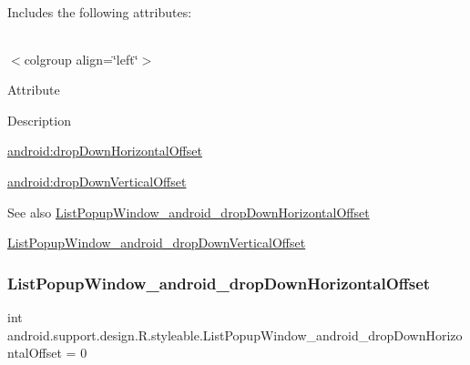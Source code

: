 Includes the following attributes\+:

\tabulinesep=1mm
\begin{longtabu} spread 0pt [c]{*{0}{|X[-1]}|}
\hline
\end{longtabu}
$<$colgroup align=\char`\"{}left\char`\"{}$>$ 

Attribute

Description 

{\ttfamily \hyperlink{classandroid_1_1support_1_1design_1_1R_1_1styleable_a142528111f7468c14655fbf25419c0f6}{android\+:drop\+Down\+Horizontal\+Offset}}

{\ttfamily \hyperlink{classandroid_1_1support_1_1design_1_1R_1_1styleable_a22740fd93f1b8f84c40c5169d6884ff7}{android\+:drop\+Down\+Vertical\+Offset}}

\begin{DoxySeeAlso}{See also}
\hyperlink{classandroid_1_1support_1_1design_1_1R_1_1styleable_a142528111f7468c14655fbf25419c0f6}{List\+Popup\+Window\+\_\+android\+\_\+drop\+Down\+Horizontal\+Offset} 

\hyperlink{classandroid_1_1support_1_1design_1_1R_1_1styleable_a22740fd93f1b8f84c40c5169d6884ff7}{List\+Popup\+Window\+\_\+android\+\_\+drop\+Down\+Vertical\+Offset} 
\end{DoxySeeAlso}
\mbox{\label{classandroid_1_1support_1_1design_1_1R_1_1styleable_a142528111f7468c14655fbf25419c0f6}} 
\subsubsection{\texorpdfstring{List\+Popup\+Window\+\_\+android\+\_\+drop\+Down\+Horizontal\+Offset}{ListPopupWindow\_android\_dropDownHorizontalOffset}}
{\footnotesize\ttfamily int android.\+support.\+design.\+R.\+styleable.\+List\+Popup\+Window\+\_\+android\+\_\+drop\+Down\+Horizontal\+Offset = 0\hspace{0.3cm}{\ttfamily [static]}}

